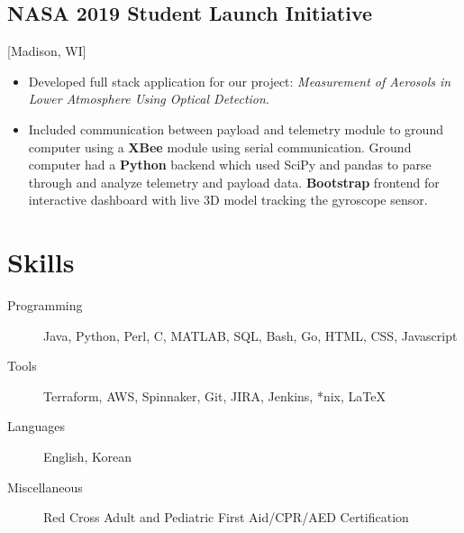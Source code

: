 \documentclass{mycv}
\begin{document}
\subsection{NASA 2019 Student Launch Initiative}[Madison, WI]
\begin{positions}
\end{positions}
\begin{itemize}
  \item Developed full stack application for our project: \textit{Measurement of Aerosols in Lower Atmosphere Using Optical Detection}.  
  \item {
  Included communication between payload and telemetry module to ground computer using a \textbf{XBee} module using serial communication. Ground computer had a \textbf{Python} backend which used SciPy and pandas to parse through and analyze telemetry and payload data. \textbf{Bootstrap} frontend for interactive dashboard with live 3D model tracking the gyroscope sensor.
  }
\end{itemize}

\iffalse
\subsection{Yu Lab (University of Wisconsin - Madison)}[Madison, WI]
\begin{positions}
  \entry{Research Intern}{Feb 2018~--~Sept 2018}
\end{positions}
\begin{itemize}
  \item{
  Researched various genes in the \textit{Aspergillus} genus and their effects on sporic life cycle. 
  }
  \item{
  Inoculated various fungal cultures with target genes knocked out and performed western blot on those samples. 
  }
\end{itemize}
\fi

\section{Skills}
\begin{description}
  \item[Programming] Java, Python, Perl, C, MATLAB, SQL, Bash, Go, HTML, CSS, Javascript
  \item[Tools] Terraform, AWS, Spinnaker, Git, JIRA, Jenkins, *nix, \LaTeX 
  \item[Languages] English, Korean
  \item[Miscellaneous] Red Cross Adult and Pediatric First Aid/CPR/AED Certification
\end{description}
\end{document}
